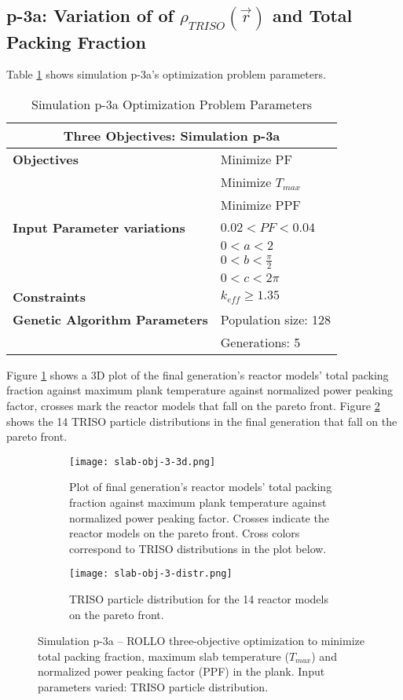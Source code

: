 \subsection{p-3a: Variation of of $\rho_{TRISO}(\vec{r})$ and Total Packing Fraction}
Table \ref{tab:simulationp3a} shows simulation p-3a's optimization problem parameters. 
\begin{table}[htbp]
    \centering
    \onehalfspacing
    \caption{Simulation p-3a Optimization Problem Parameters}
	\label{tab:simulationp3a}
    \footnotesize
    \begin{tabular}{l|p{4cm}}
    \hline 
    \multicolumn{2}{c}{\textbf{Three Objectives: Simulation p-3a}} \\
    \hline 
    \textbf{Objectives} & Minimize PF \\
    & Minimize $T_{max}$ \\
    & Minimize PPF \\
    \hline 
    \textbf{Input Parameter variations} & $0.02<PF<0.04$ \\
    & $0<a<2$ \\
    & $0<b<\frac{\pi}{2}$ \\
    & $0<c<2\pi$ \\
    \hline
    \textbf{Constraints} & $k_{eff} \geq 1.35$\\ 
    \hline 
    \textbf{Genetic Algorithm Parameters} & Population size: 128 \\
    & Generations: 5 \\
    \hline
    \end{tabular}
\end{table}
Figure \ref{fig:slab-obj-3-3d} shows a 3D plot of the final generation's reactor models' 
total packing fraction against maximum plank temperature against normalized power 
peaking factor, crosses mark the reactor models that fall on the pareto front.
Figure \ref{fig:slab-obj-3-distr} shows the 14 TRISO particle distributions in 
the final generation that fall on the pareto front. 
\begin{figure}[htbp]
    \begin{subfigure}{\textwidth}
        \centering
        \texttt{[image: slab-obj-3-3d.png]}
        \caption{Plot of final generation's reactor models' total packing fraction against maximum plank 
        temperature against normalized power peaking factor. Crosses indicate the reactor models on the 
        pareto front. Cross colors correspond to TRISO distributions in the plot below.}
        \label{fig:slab-obj-3-3d} 
    \end{subfigure}
    \begin{subfigure}{\textwidth}
        \texttt{[image: slab-obj-3-distr.png]}
        \caption{TRISO particle distribution for the 14 reactor models on the pareto front.}
        \label{fig:slab-obj-3-distr} 
    \end{subfigure}
    \caption{Simulation p-3a -- ROLLO three-objective optimization to minimize total packing fraction, 
    maximum slab temperature ($T_{max}$) and normalized power peaking factor (PPF) in the plank. Input parameters varied: 
    TRISO particle distribution.}
    \label{fig:slab-obj-3}
\end{figure}

